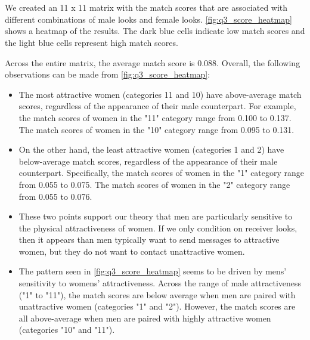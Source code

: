 \section{}
We created an 11 x 11 matrix with the match scores that are associated with different combinations of male looks and female looks. \vref{fig:q3_score_heatmap} shows a heatmap of the results. The dark blue cells indicate low match scores and the light blue cells represent high match scores. 

Across the entire matrix, the average match score is 0.088. Overall, the following observations can be made from \cref{fig:q3_score_heatmap}:
\begin{itemize}
\item The most attractive women (categories 11 and 10) have above-average match scores, regardless of the appearance of their male counterpart. For example, the match scores of women in the "11" category range from 0.100 to 0.137. The match scores of women in the "10" category range from 0.095 to 0.131.

\item On the other hand, the least attractive women (categories 1 and 2) have below-average match scores, regardless of the appearance of their male counterpart. Specifically, the  match scores of women in the "1" category range from 0.055 to 0.075. The match scores of women in the "2" category range from 0.055 to 0.076.

\item These two points support our theory that men are particularly sensitive to the physical attractiveness of women. If we only condition on receiver looks, then it appears than men typically want to send messages to attractive women, but they do not want to contact unattractive women.

\item The pattern seen in \cref{fig:q3_score_heatmap} seems to be driven by mens' sensitivity to womens' attractiveness. Across the range of male attractiveness ("1" to "11"), the match scores are below average when men are paired with unattractive women (categories "1" and "2"). However, the match scores are all above-average when men are paired with highly attractive women (categories "10" and "11").   
\end{itemize}

